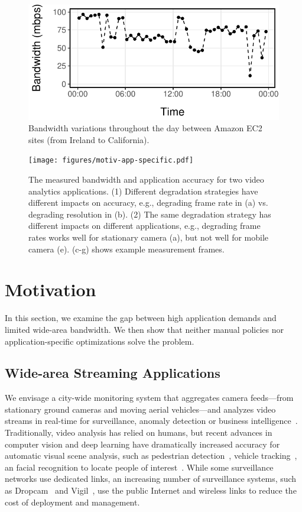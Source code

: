 \begin{figure}
  \centering
  \includegraphics[width=.9\linewidth]{figures/aws-variation.pdf}
  \caption{Bandwidth variations throughout the day between Amazon EC2 sites
    (from Ireland to California).}
  \label{fig:bw}
\end{figure}

\begin{figure}
  \centering
  \texttt{[image: figures/motiv-app-specific.pdf]}
  \caption{The measured bandwidth and application accuracy for two video analytics applications.
  (1) Different degradation strategies have different impacts on accuracy, e.g., degrading frame rate in (a) vs.\,degrading resolution in (b).
  (2) The same degradation strategy has different impacts on different applications, e.g., degrading frame rates works well for stationary camera (a), but not well for mobile camera (e). (c-g) shows example measurement frames.}
  \label{fig:app-specific}
\end{figure}

\section{Motivation}
\label{sec:motivation}

In this section, we examine the gap between high application demands and limited
wide-area bandwidth. We then show that neither manual policies nor
application-specific optimizations solve the problem.

\subsection{Wide-area Streaming Applications}
\label{sec:wide-area-streaming}

 We envisage a city-wide monitoring system that
aggregates camera feeds---from stationary ground cameras and moving aerial
vehicles---and analyzes video streams in real-time for surveillance, anomaly
detection or business intelligence~\cite{oh2011large}. Traditionally, video
analysis has relied on humans, but recent advances in computer vision and deep
learning have dramatically increased accuracy for automatic visual scene analysis,
such as pedestrian detection~\cite{dollar2012pedestrian}, vehicle
tracking~\cite{coifman1998real}, an facial recognition to locate people of
interest~\cite{parkhi2015deep, Lu:2015:SHF:2888116.2888245}. While some
surveillance networks use dedicated links, an increasing number of surveillance
systems, such as Dropcam~\cite{dropcam} and Vigil~\cite{zhang2015design}, use
the public Internet and wireless links to reduce the cost of deployment and
management.

